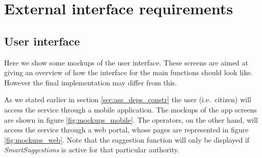 \section{External interface requirements}

\subsection{User interface}

Here we show some mockups of the user interface. These screens are aimed at
giving an overview of how the interface for the main functions should look like.
However the final implementation may differ from this.

As we stated earlier in section \vref{sec:ass_deps_constr} the user (i.e.\
citizen) will access the service through a mobile application. The mockups
of the app screens are shown in figure \vref{fig:mockups_mobile}.
The operators, on the other hand, will access the service through a web portal,
whose pages are represented in figure \vref{fig:mockups_web}. Note that the
suggestion function will only be displayed if \emph{SmartSuggestions} is active
for that particular authority.

